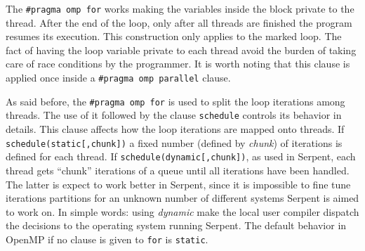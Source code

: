 \documentclass[twoside,a4paper,12pt,english]{anstrans}
\begin{document}
%
%

The \texttt{\#pragma omp for} works making the variables inside the block private to
the thread. After the end of the loop, only after all threads are finished the
program resumes its execution. This construction only
applies to the marked loop. The fact of having the loop variable private to each
thread avoid the burden of taking care of race conditions by the programmer. It is
worth noting that this clause is applied once inside a \texttt{\#pragma omp parallel} clause.


As said before, the \texttt{\#pragma omp for} is used to split the loop iterations among threads.
The use of it followed by the clause \texttt{schedule} controls its behavior in details. This
clause affects how the loop iterations are mapped onto threads. If \texttt{schedule(static[,chunk])}
a fixed number (defined by \textit{chunk}) of iterations is defined for each thread. If
\texttt{schedule(dynamic[,chunk])}, as used in Serpent, each thread gets ``chunk'' iterations
of a queue until all iterations have been handled. The latter is expect to work better in Serpent,
since it is impossible to fine tune iterations partitions for an unknown number of different
systems Serpent is aimed to work on. In simple words: using \textit{dynamic} make the local user
compiler dispatch the decisions to the operating system running Serpent. The default behavior
in OpenMP if no clause is given to \texttt{for} is \texttt{static}.
\end{document}
